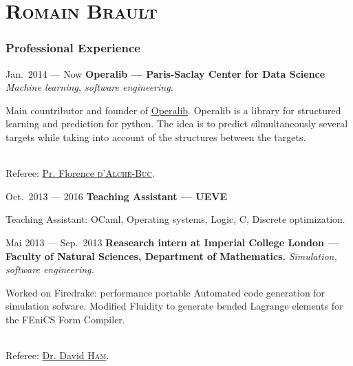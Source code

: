 \documentclass{tccv}
\begin{document}
\part{\textsc{Romain Brault}}

\section{Professional Experience}

\begin{eventlist}

\item{Jan.~2014 --- Now}
     {\textbf{Operalib --- Paris-Saclay Center for Data Science}}
     {\large \textit{Machine learning, software engineering.}}

Main countributor and founder of
\href{https://github.com/operalib/operalib}{Operalib}. Operalib is a library
for structured learning and prediction for python. The idea is to predict
silmultaneously several targets while taking into account of the structures
between the targets.

\vspace{-5mm}\paragraph{}
Referee: \href{http://perso.telecom-paristech.fr/~fdalche/Site/index.html}{Pr.
Florence \textsc{d'Alch\'e-Buc}}.

\item{Oct.~2013 --- 2016}
     {\textbf{Teaching Assistant --- UEVE}}
     {}

\vspace{-5mm}
{Teaching Assistant: OCaml, Operating systems, Logic, C, Discrete
optimization.}

\item{Mai 2013 --- Sep.~2013}
     {\textbf{Reasearch intern at Imperial College London --- Faculty of
     Natural Sciences, Department of Mathematics.}}
     {\large \textit{Simulation, software engineering.}}

Worked on Firedrake: performance portable Automated code generation for
simulation sofware. Modified Fluidity to generate bended Lagrange elements for
the FEniCS Form Compiler.

\vspace{-5mm}\paragraph{}
Referee: \href{https://www3.imperial.ac.uk/people/david.ham/}{Dr. David
\textsc{Ham}}.



\end{eventlist}
\end{document}
